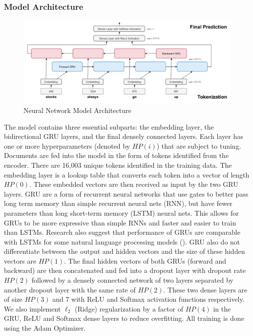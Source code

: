 \documentclass[11pt]{article}
\begin{document}
\subsubsection{Model Architecture}
\begin{figure}[h!]
  \includegraphics[width=\textwidth,height=\textheight,keepaspectratio]{architecture.drawio.png}
    \caption{Neural Network Model Architecture}
\end{figure}


\noindent The model contains three essential subparts: the embedding layer, the bidirectional GRU layers, and the final densely connected layers. Each layer has one or more hyperparameters (denoted by $HP(i)$) that are subject to tuning. Documents are fed into the model in the form of tokens identified from the encoder. There are 16,003 unique tokens identified in the training data. The embedding layer is a lookup table that converts each token into a vector of length $HP(0)$. These embedded vectors are then received as input by the two GRU layers. GRU are a form of recurrent neural networks that use gates to better pass long term memory than simple recurrent neural nets (RNN), but have fewer parameters than long short-term memory (LSTM) neural nets. This allows for GRUs to be more expressive than simple RNNs and faster and easier to train than LSTMs. Research also suggest that performance of GRUs are comparable with LSTMs for some natural language processing models (\cite{GRU}). GRU also do not differentiate between the output and hidden vectors and the size of these hidden vectors are $HP(1)$. The final hidden vectors of both GRUs (forward and backward) are then concatenated and fed into a dropout layer with dropout rate $HP(2)$ followed by a densely connected network of two layers separated by another dropout layer with the same rate of $HP(2)$. These two dense layers are of size $HP(3)$ and 7 with ReLU and Softmax activation functions respectively. We also implement $\ell_2$ (Ridge) regularization by a factor of $HP(4)$ in the GRU, ReLU and Softmax dense layers to reduce overfitting. All training is done using the Adam Optimizer.
\end{document}
